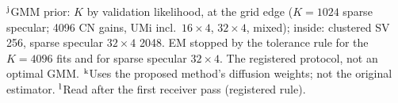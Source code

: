 \begin{table}[!t]
\begin{minipage}{\columnwidth}
$^{\rm j}$GMM prior: $K$ by validation likelihood, at the grid edge ($K=1024$ sparse specular; 4096 CN gains, UMi incl.\ $16\times4$, $32\times4$, mixed); inside: clustered SV 256, sparse specular $32\times4$ 2048. EM stopped by the tolerance rule for the $K=4096$ fits and for sparse specular $32\times4$. The registered protocol, not an optimal GMM.
$^{\rm k}$Uses the proposed method's diffusion weights; not the original estimator. $^{\rm l}$Read after the first receiver pass (registered rule).
\end{minipage}
\end{table}
